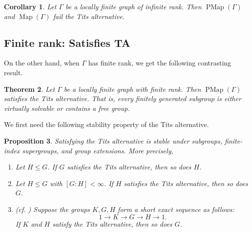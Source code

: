 \documentclass[11pt]{amsart}
\theoremstyle{plain}
\newtheorem{THM}{Theorem}[section]
\newtheorem{PROP}[THM]{Proposition}
\newtheorem{COR}[THM]{Corollary}
\theoremstyle{definition}
\DeclareMathOperator{\PMap}{PMap}
\DeclareMathOperator{\Map}{Map}
\def\G{{\Gamma}}
\newcommand{\<}{\langle}
\renewcommand{\>}{\rangle}
\begin{document}
\begin{COR}\label{cor:nonTA}
     Let $\G$ be a locally finite graph of infinite rank. Then $\PMap(\G)$ and $\Map(\G)$ fail the Tits alternative. 
\end{COR}


\subsection{Finite rank: Satisfies TA}
On the other hand, when $\G$ has finite rank, we get the following contrasting result.

\begin{THM}\label{thm:TA_finite}
    Let $\G$ be a locally finite graph with finite rank. Then $\PMap(\G)$ satisfies the Tits alternative. That is, every finitely generated subgroup is either virtually solvable or contains a free group.
\end{THM}

We first need the following stability property of the Tits alternative.

\begin{PROP}\label{prop:TAprops}
    Satisfying the Tits alternative is stable under subgroups, finite-index supergroups, and group extensions. More precisely,
    \begin{enumerate}
        \item Let $H \le G$. If $G$ satisfies the Tits alternative, then so does $H$.
        \item Let $H \le G$ with $[G:H]<\infty$. If $H$ satisfies the Tits alternative, then so does $G$.
        \item \textrm{(cf. \cite[Proposition 6.3]{Cantat2011})} Suppose the groups $K,G,H$ form a short exact sequence as follows:
        \[
            1 \longrightarrow K \longrightarrow G \longrightarrow H \longrightarrow 1.
        \]
        If $K$ and $H$ satisfy the Tits alternative, then so does $G$.
    \end{enumerate}
\end{PROP}
\end{document}
